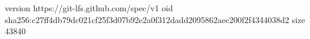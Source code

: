 version https://git-lfs.github.com/spec/v1
oid sha256:c27ff4db79dc021cf25f3d07b92e2a0f312dadd2095862aec200f2f4344038d2
size 43840
